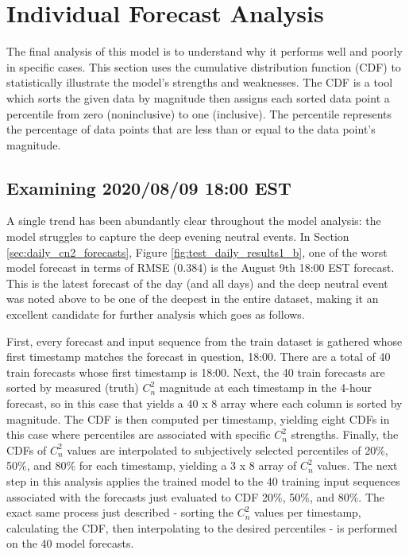 \section{Individual Forecast Analysis}
The final analysis of this model is to understand why it performs well and poorly in specific cases. This section uses the cumulative distribution function (CDF) to statistically illustrate the model's strengths and weaknesses. The CDF is a tool which sorts the given data by magnitude then assigns each sorted data point a percentile from zero (noninclusive) to one (inclusive). The percentile represents the percentage of data points that are less than or equal to the data point's magnitude.

\subsection{Examining 2020/08/09 18:00 EST}
A single trend has been abundantly clear throughout the model analysis: the model struggles to capture the deep evening neutral events. In Section \ref{sec:daily_cn2_forecasts}, Figure \ref{fig:test_daily_results1_b}, one of the worst model forecast in terms of RMSE (0.384) is the August 9th 18:00 EST forecast. This is the latest forecast of the day (and all days) and the deep neutral event was noted above to be one of the deepest in the entire dataset, making it an excellent candidate for further analysis which goes as follows.

First, every forecast and input sequence from the train dataset is gathered whose first timestamp matches the forecast in question, 18:00. There are a total of 40 train forecasts whose first timestamp is 18:00. Next, the 40 train forecasts are sorted by measured (truth) $C_{n}^{2}$ magnitude at each timestamp in the 4-hour forecast, so in this case that yields a 40 x 8 array where each column is sorted by magnitude. The CDF is then computed per timestamp, yielding eight CDFs in this case where percentiles are associated with specific $C_{n}^{2}$ strengths. Finally, the CDFs of $C_{n}^{2}$ values are interpolated to subjectively selected percentiles of  20\%, 50\%, and 80\% for each timestamp, yielding a 3 x 8 array of $C_{n}^{2}$ values. The next step in this analysis applies the trained model to the 40 training input sequences associated with the forecasts just evaluated to CDF 20\%, 50\%, and 80\%. The exact same process just described - sorting the $C_{n}^{2}$ values per timestamp, calculating the CDF, then interpolating to the desired percentiles - is performed on the 40 model forecasts.

